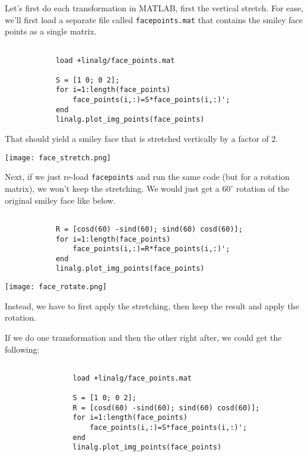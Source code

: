 \documentclass{ximera}
\begin{document}
\begin{exploration}
\begin{example}
        Let's first do each transformation in MATLAB, first the vertical stretch. For ease, we'll first load a separate file called \texttt{face\textunderscore points.mat} that contains the smiley face points as a single matrix.

        \begin{verbatim}

            load +linalg/face_points.mat
        
            S = [1 0; 0 2];
            for i=1:length(face_points)
                face_points(i,:)=S*face_points(i,:)';
            end
            linalg.plot_img_points(face_points)

        \end{verbatim}

        That should yield a smiley face that is stretched vertically by a factor of $2$.

        \begin{center}
            \texttt{[image: face\_stretch.png]}
        \end{center}

        Next, if we just re-load \texttt{face\textunderscore points} and run the same code (but for a rotation matrix), we won't keep the stretching. We would just get a $60^\circ$ rotation of the original smiley face like below.

        \begin{verbatim}

            R = [cosd(60) -sind(60); sind(60) cosd(60)];
            for i=1:length(face_points)
                face_points(i,:)=R*face_points(i,:)';
            end
            linalg.plot_img_points(face_points)
        \end{verbatim}

        \begin{center}
            \texttt{[image: face\_rotate.png]}
        \end{center}

        Instead, we have to first apply the stretching, then keep the result and apply the rotation. 

        If we do one transformation and then the other right after, we could get the following: 

        \begin{verbatim}
                
                load +linalg/face_points.mat
    
                S = [1 0; 0 2];
                R = [cosd(60) -sind(60); sind(60) cosd(60)];
                for i=1:length(face_points)
                    face_points(i,:)=S*face_points(i,:)';
                end
                linalg.plot_img_points(face_points)


\end{verbatim}
\end{example}
\end{exploration}
\end{document}
